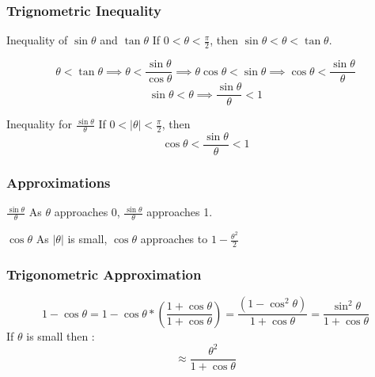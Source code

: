 \documentclass{beamer}
\begin{document}
    \begin{frame}
    \frametitle{Trignometric Inequality}
    \begin{block}{Inequality of \(\sin \theta\) and \(\tan \theta\)}
        If \( 0 < \theta < \frac{\pi}{2} \), then \(\sin \theta < \theta < \tan \theta \).
    \end{block}
    \begin{displaymath}
        \theta < \tan \theta \implies \theta < \frac{\sin \theta}{\cos \theta} \implies \theta \cos \theta < \sin \theta \implies \cos \theta < \frac{\sin \theta}{\theta}
    \end{displaymath}
    \begin{displaymath}
        \sin \theta < \theta \implies \frac{\sin \theta}{\theta} < 1
    \end{displaymath}
    \begin{block}{Inequality for \( \frac{\sin \theta}{\theta} \)}
        If \( 0 < |\theta| < \frac{\pi}{2} \), then
        \[ \cos \theta <  \frac{\sin \theta}{\theta} < 1 \]
    \end{block}
    \end{frame}

    \begin{frame}
        \frametitle{Approximations}
        \begin{block}{\( \frac{\sin \theta}{\theta} \)}
            As \( \theta \) approaches 0, \( \frac{\sin \theta}{\theta} \) approaches 1.
        \end{block}
        \begin{block}{\(  \cos \theta \)}
            As \( |\theta| \) is small, \( \cos \theta \) approaches to  \(1 - \frac{\theta^2}{2} \)
        \end{block}
    \end{frame} 

    \begin{frame}
    \frametitle{Trigonometric Approximation}
    \begin{displaymath}
        1 - \cos \theta = 1 - \cos \theta * (\frac{1 + \cos \theta}{1 + \cos \theta}) = \frac{(1 - \cos^2 \theta)}{1 + \cos \theta} = \frac{\sin^2 \theta}{1 + \cos \theta}
    \end{displaymath}
    If \( \theta\) is small then :
    \begin{displaymath}
      \approx  \frac{\theta ^{2}}{1+ \cos \theta}
    \end{displaymath}
    \end{frame}
\end{document}
